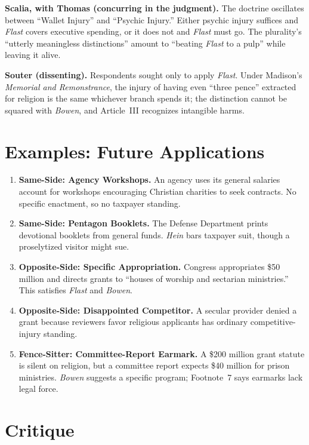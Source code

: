 \documentclass[12pt]{article}
\begin{document}
\textbf{Scalia, with Thomas (concurring in the judgment).} The doctrine oscillates between ``Wallet Injury'' and ``Psychic Injury.'' Either psychic injury suffices and \textit{Flast} covers executive spending, or it does not and \textit{Flast} must go. The plurality's ``utterly meaningless distinctions'' amount to ``beating \textit{Flast} to a pulp'' while leaving it alive.

\textbf{Souter (dissenting).} Respondents sought only to apply \textit{Flast}. Under Madison's \textit{Memorial and Remonstrance}, the injury of having even ``three pence'' extracted for religion is the same whichever branch spends it; the distinction cannot be squared with \textit{Bowen}, and Article~III recognizes intangible harms.

\section{Examples: Future Applications}

\begin{enumerate}
\item \textbf{Same-Side: Agency Workshops.} An agency uses its general salaries account for workshops encouraging Christian charities to seek contracts. No specific enactment, so no taxpayer standing.
\item \textbf{Same-Side: Pentagon Booklets.} The Defense Department prints devotional booklets from general funds. \textit{Hein} bars taxpayer suit, though a proselytized visitor might sue.
\item \textbf{Opposite-Side: Specific Appropriation.} Congress appropriates \$50 million and directs grants to ``houses of worship and sectarian ministries.'' This satisfies \textit{Flast} and \textit{Bowen}.
\item \textbf{Opposite-Side: Disappointed Competitor.} A secular provider denied a grant because reviewers favor religious applicants has ordinary competitive-injury standing.
\item \textbf{Fence-Sitter: Committee-Report Earmark.} A \$200 million grant statute is silent on religion, but a committee report expects \$40 million for prison ministries. \textit{Bowen} suggests a specific program; Footnote~7 says earmarks lack legal force.
\end{enumerate}

\section{Critique}
\end{document}
